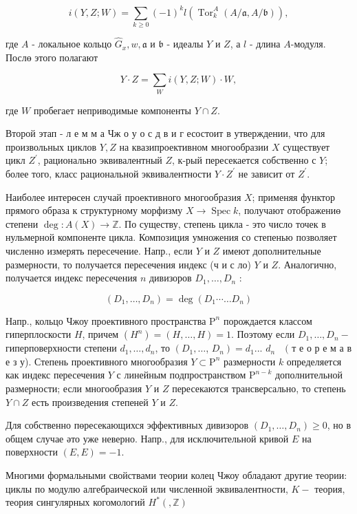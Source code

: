 \documentclass[10pt]{article}
\begin{document}
\[
i(Y, Z ; W)=\sum_{k \geqslant 0}(-1)^{k} l\left(\operatorname{Tor}_{k}^{A}(A / \mathfrak{a}, A / \mathfrak{b})\right),
\]

где $A$ - локальное кольцо $\widehat{G}_{x}, w, \mathfrak{a}$ и $\mathfrak{b}$ - идеалы $Y$ и $Z$, а $l$ - длина $A$-модуля. Послө этого полагают

\[
Y \cdot Z=\sum_{W} i(Y, Z ; W) \cdot W,
\]

где $W$ пробегает неприводимые компоненты $Y \cap Z$.

Второй этап - л е м м а Чж о у о с д в и г есостоит в утверждении, что для произвольных циклов $Y, Z$ на квазипроективном многообразии $X$ существует цикл $Z^{\prime}$, рационально эквивалентный $Z$, к-рый пересекается собственно с $Y$; более того, класс рациональной эквивалентности $Y \cdot Z^{\prime}$ не зависит от $Z^{\prime}$.

Наиболее интерөсен случай проективного многообразия $X$; применяя функтор прямого образа к структурному морфизму $X \rightarrow \operatorname{Spec} k$, получают отображениө степени $\operatorname{deg}: A(X) \rightarrow \mathbb{Z}$. По существу, степень цикла - это число точек в нульмерной компоненте цикла. Композиция умножения со степенью позволяет численно измерять пересечение. Напр., если $Y$ и $Z$ имеют дополнительные размерности, то получается пересечения индекс (ч и с ло) $Y$ и $Z$. Аналогично, получается индекс пересечения $n$ дивизоров $D_{1}, \ldots, D_{n}$ :

\[
\left(D_{1}, \ldots, D_{n}\right)=\operatorname{deg}\left(D_{1} \cdots \ldots D_{n}\right)
\]

Напр., кольцо Чжоу проективного пространства $\mathrm{P}^{n}$ порождается классом гиперплоскости $H$, причем $\left(H^{n}\right)=(H, \ldots, H)=1$. Поэтому если $D_{1}, \ldots, D_{n}-$ гиперповерхности степени $d_{1}, \ldots, d_{n}$, то $\left(D_{1}, \ldots\right.$, $\left.D_{n}\right)=d_{1}$... $d_{n} \quad($ т е о р е м а в е з у). Степень проективного многообразия $Y \subset \mathrm{P}^{n}$ размерности $k$ определяется как индекс пересечения $Y$ с линейным подпространством $\mathrm{P}^{n-k}$ дополнительной размерности; если многообразия $Y$ и $Z$ пересекаются трансверсально, то степень $Y \cap Z$ есть произведения степеней $Y$ и $Z$.

Для собственно пөресекающихся эффективных дивизоров $\left(D_{1}, \ldots, D_{n}\right) \geqslant 0$, но в общем случае әто уже неверно. Напр., для исключительной кривой $E$ на поверхности $(E, E)=-1$.

Многими формальными свойствами теории колец Чжоу обладают другие теории: циклы по модулю алгебраической или численной эквивалентности, $K-$ теория, теория сингулярных когомологий $H^{*}(, \mathbb{Z})$
\end{document}
